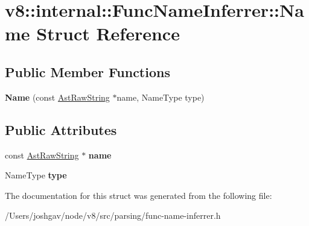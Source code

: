 \hypertarget{structv8_1_1internal_1_1_func_name_inferrer_1_1_name}{}\section{v8\+:\+:internal\+:\+:Func\+Name\+Inferrer\+:\+:Name Struct Reference}
\label{structv8_1_1internal_1_1_func_name_inferrer_1_1_name}
\subsection*{Public Member Functions}
\begin{DoxyCompactItemize}
\item 
{\bfseries Name} (const \hyperlink{classv8_1_1internal_1_1_ast_raw_string}{Ast\+Raw\+String} $\ast$name, Name\+Type type)\hypertarget{structv8_1_1internal_1_1_func_name_inferrer_1_1_name_a8fd5e79a21682fa1db83e6e642af670b}{}\label{structv8_1_1internal_1_1_func_name_inferrer_1_1_name_a8fd5e79a21682fa1db83e6e642af670b}

\end{DoxyCompactItemize}
\subsection*{Public Attributes}
\begin{DoxyCompactItemize}
\item 
const \hyperlink{classv8_1_1internal_1_1_ast_raw_string}{Ast\+Raw\+String} $\ast$ {\bfseries name}\hypertarget{structv8_1_1internal_1_1_func_name_inferrer_1_1_name_acf3f8558b259582c5b3138101ef20881}{}\label{structv8_1_1internal_1_1_func_name_inferrer_1_1_name_acf3f8558b259582c5b3138101ef20881}

\item 
Name\+Type {\bfseries type}\hypertarget{structv8_1_1internal_1_1_func_name_inferrer_1_1_name_a9bd74f3a96dd806901f963df65f9e581}{}\label{structv8_1_1internal_1_1_func_name_inferrer_1_1_name_a9bd74f3a96dd806901f963df65f9e581}

\end{DoxyCompactItemize}


The documentation for this struct was generated from the following file\+:\begin{DoxyCompactItemize}
\item 
/\+Users/joshgav/node/v8/src/parsing/func-\/name-\/inferrer.\+h\end{DoxyCompactItemize}
